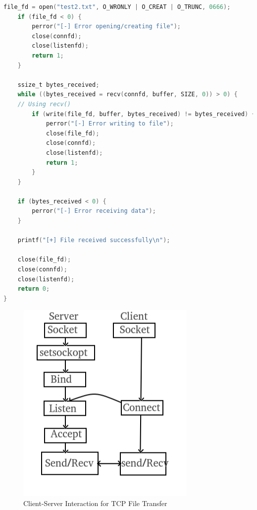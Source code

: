 \documentclass{article}
\begin{document}
\begin{lstlisting}[language=C, caption=Sever C Code, label=lst:code]
    file_fd = open("test2.txt", O_WRONLY | O_CREAT | O_TRUNC, 0666);
    if (file_fd < 0) {
        perror("[-] Error opening/creating file");
        close(connfd);
        close(listenfd);
        return 1;
    }

    ssize_t bytes_received;
    while ((bytes_received = recv(connfd, buffer, SIZE, 0)) > 0) {  
    // Using recv()
        if (write(file_fd, buffer, bytes_received) != bytes_received) {
            perror("[-] Error writing to file");
            close(file_fd);
            close(connfd);
            close(listenfd);
            return 1;
        }
    }

    if (bytes_received < 0) {
        perror("[-] Error receiving data");
    }

    printf("[+] File received successfully\n");

    close(file_fd);
    close(connfd);
    close(listenfd);
    return 0;
}
\end{lstlisting}

\begin{figure}
    \centering
    \includegraphics[width=1\linewidth]{Socket_server-1-modified.png}
    \caption{Client-Server Interaction for TCP File Transfer}
    \label{fig:enter-label}
\end{figure}
\end{document}
